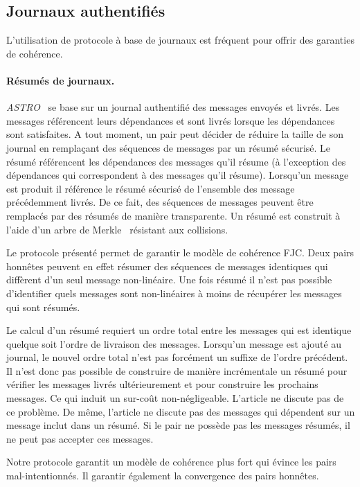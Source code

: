 \subsection{Journaux authentifiés}



L'utilisation de protocole à base de journaux est fréquent pour offrir des garanties de cohérence.

\paragraph{Résumés de journaux.} \emph{ASTRO}~\autocite{mahajan_astro_2008} se base sur un journal authentifié des messages envoyés et livrés.
Les messages référencent leurs dépendances et sont livrés lorsque les dépendances sont satisfaites.
A tout moment, un pair peut décider de réduire la taille de son journal en remplaçant des séquences de messages par un résumé sécurisé.
Le résumé référencent les dépendances des messages qu'il résume (à l'exception des dépendances qui correspondent à des messages qu'il résume).
Lorsqu'un message est produit il référence le résumé sécurisé de l'ensemble des message précédemment livrés.
De ce fait, des séquences de messages peuvent être remplacés par des résumés de manière transparente.
Un résumé est construit à l'aide d'un arbre de Merkle~\autocite{merkle_1979_merkletree} résistant aux collisions.

Le protocole présenté permet de garantir le modèle de cohérence \acf{FJC}.
Deux pairs honnêtes peuvent en effet résumer des séquences de messages identiques qui diffèrent d'un seul message non-linéaire.
Une fois résumé il n'est pas possible d'identifier quels messages sont non-linéaires à moins de récupérer les messages qui sont résumés.

Le calcul d'un résumé requiert un ordre total entre les messages qui est identique quelque soit l'ordre de livraison des messages.
Lorsqu'un message est ajouté au journal, le nouvel ordre total n'est pas forcément un suffixe de l'ordre précédent.
Il n'est donc pas possible de construire de manière incrémentale un résumé pour vérifier les messages livrés ultérieurement et pour construire les prochains messages.
Ce qui induit un sur-coût non-négligeable.
L'article ne discute pas de ce problème.
De même, l'article ne discute pas des messages qui dépendent sur un message inclut dans un résumé.
Si le pair ne possède pas les messages résumés, il ne peut pas accepter ces messages.

Notre protocole garantit un modèle de cohérence plus fort qui évince les pairs mal-intentionnés.
Il garantir également la convergence des pairs honnêtes.

